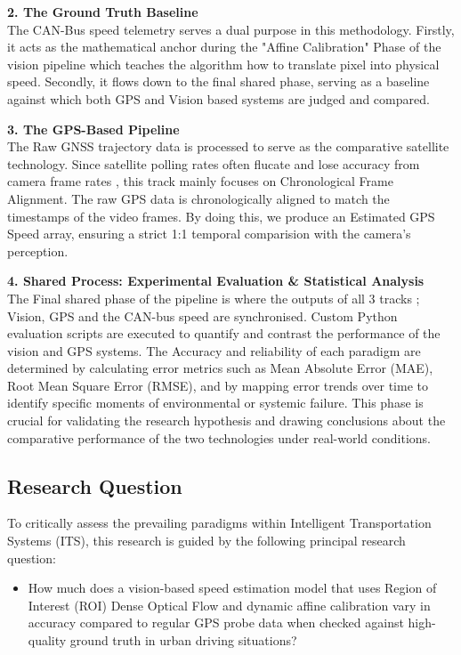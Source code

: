 \textbf{2. The Ground Truth Baseline}\\
The CAN-Bus speed telemetry serves a dual purpose in this methodology. Firstly, it acts as the mathematical anchor during the "Affine Calibration" Phase of the vision pipeline which teaches the algorithm how to translate pixel into physical speed. Secondly, it flows down to the final shared phase, serving as a baseline against which both GPS and Vision based systems are judged and compared.

\textbf{3. The GPS-Based Pipeline}\\
The Raw GNSS trajectory data is processed to serve as the comparative satellite technology. Since satellite polling rates often flucate and lose accuracy from camera frame rates , this track mainly focuses on Chronological Frame Alignment. The raw GPS data is chronologically aligned to match the timestamps of the video frames. By doing this, we produce an Estimated GPS Speed array, ensuring a strict 1:1 temporal comparision with the camera's perception.

\textbf{4. Shared Process: Experimental Evaluation \& Statistical Analysis}\\
The Final shared phase of the pipeline is where the outputs of all 3 tracks ; Vision, GPS and the CAN-bus speed are synchronised. Custom Python evaluation scripts are executed to quantify and contrast the performance of the vision and GPS systems. The Accuracy and reliability of each paradigm are determined by calculating error metrics such as Mean Absolute Error (MAE), Root Mean Square Error (RMSE), and by mapping error trends over time to identify specific moments of environmental or systemic failure. This phase is crucial for validating the research hypothesis and drawing conclusions about the comparative performance of the two technologies under real-world conditions.
\subsection{Research Question}
To critically assess the prevailing paradigms within Intelligent Transportation Systems (ITS), this research is guided by the following principal research question:
\begin{itemize}
    \item How much does a vision-based speed estimation model that uses Region of Interest (ROI) Dense Optical Flow and dynamic affine calibration vary in accuracy compared to regular GPS probe data when checked against high-quality ground truth in urban driving situations?
\end{itemize}

